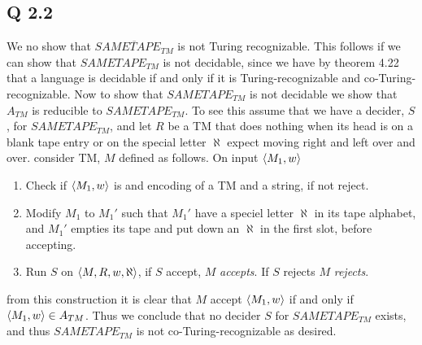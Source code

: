 \documentclass[a4paper,11pt]{article}
\numberwithin{equation}{section}
\begin{document}
\subsection*{Q 2.2}
We no show that $ \overline{SAMETAPE_{TM}} $ is not Turing recognizable. This follows if we can show that $ SAMETAPE_{TM} $ is not decidable, since we have by theorem 4.22 that a language is decidable if and only if it is Turing-recognizable and co-Turing-recognizable. Now to show that $ SAMETAPE_{TM} $ is not decidable we show that $ A_{TM}$ is reducible to $SAMETAPE_{TM} $. To see this assume that we have a decider, $ S $, for $SAMETAPE_{TM} $, and let $ R $ be a TM that does nothing when its head is on a blank tape entry or on the special letter $ \aleph $ expect moving right and left over and over. consider TM, $ M $ defined as follows. On input $ \braket{M_1,w} $\begin{enumerate}
	\item Check if $ \braket{M_1,w} $ is and encoding of a TM and a string, if not reject.\\
	\item Modify $ M_1 $ to $ M_1' $ such that $ M_1' $ have a speciel letter $ \aleph $ in its tape alphabet, and $ M_1' $ empties its tape and put down an $ \aleph $ in the first slot, before accepting.
	\item Run $ S $ on $ \braket{M,R,w,\aleph} $, if $ S $ accept, $ M $ \emph{accepts}. If $ S $ rejects $ M $ \emph{rejects}.
\end{enumerate}
from this construction it is clear that $ M $ accept $ \braket{M_1,w} $ if and only if $ \braket{M_1,w}\in A_{TM} $. Thus we conclude that no decider $ S $ for $ SAMETAPE_{TM}  $ exists, and thus $ SAMETAPE_{TM}  $ is not co-Turing-recognizable as desired.
\end{document}

